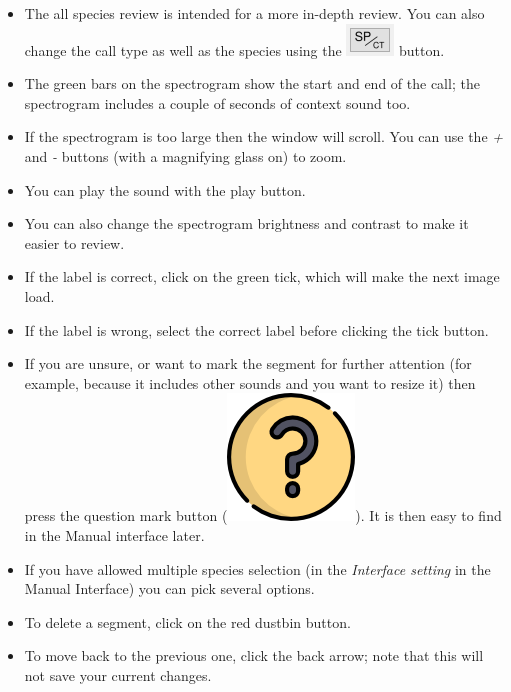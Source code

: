 \documentclass{scrartcl}
\begin{document}
\begin{itemize}
\item The all species review is intended for a more in-depth review. You can also change the call type as well as the species using the \includegraphics[scale=0.5]{Figures/SPCT} button.
\item The green bars on the spectrogram show the start and end of the call; the spectrogram includes a couple of seconds of context sound too. 
\item If the spectrogram is too large then the window will scroll. You can use the \textit{+} and \textit{-} buttons (with a magnifying glass on) to zoom. 
\item You can play the sound with the play button. 
\item You can also change the spectrogram brightness and contrast to make it easier to review. 
\item If the label is correct, click on the green tick, which will make the next image load. 
\item If the label is wrong, select the correct label before clicking the tick button. 
\item If you are unsure, or want to mark the segment for further attention (for example, because it includes other sounds and you want to resize it) then press the question mark button (\includegraphics[scale=0.03]{Figures/questionL}). It is then easy to find in the Manual interface later.
\item If you have allowed multiple species selection (in the \textit{Interface setting} in the Manual Interface) you can pick several options. 
\item To delete a segment, click on the red dustbin button. 
\item To move back to the previous one, click the back arrow; note that this will not save your current changes. 
\end{itemize}

\end{document}
